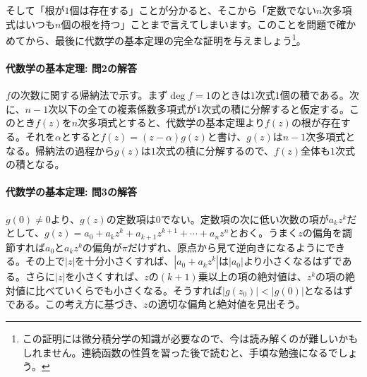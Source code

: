 そして「根が$1$個は存在する」ことが分かると、そこから「定数でない$n$次多項式はいつも$n$個の根を持つ」ことまで言えてしまいます。このことを問題で確かめてから、最後に代数学の基本定理の完全な証明を与えましょう\footnote{この証明には微分積分学の知識が必要なので、今は読み解くのが難しいかもしれません。連続函数の性質を習った後で読むと、手頃な勉強になるでしょう。}。

\paragraph{代数学の基本定理: 問2の解答}
$f$の次数に関する帰納法で示す。まず$\deg f=1$のときは$1$次式$1$個の積である。次に、$n-1$次以下の全ての複素係数多項式が$1$次式の積に分解すると仮定する。このとき$f(z)$を$n$次多項式とすると、代数学の基本定理より$f(z)$の根が存在する。それを$\alpha$とすると$f(z)=(z-\alpha)g(z)$と書け、$g(z)$は$n-1$次多項式となる。帰納法の過程から$g(z)$は$1$次式の積に分解するので、$f(z)$全体も$1$次式の積となる。


\paragraph{代数学の基本定理: 問3の解答}

$g(0)\neq 0$より、$g(z)$の定数項は$0$でない。定数項の次に低い次数の項が$a_k z^k$だとして、$g(z) = a_0 + a_k z^k + a_{k+1} z^{k+1} + \cdots + a_n z^n$とおく。うまく$z$の偏角を調節すれば$a_0$と$a_k z^k$の偏角が$\pi$だけずれ、原点から見て逆向きになるようにできる。その上で$|z|$を十分小さくすれば、$|a_0+a_k z^k|$は$|a_0|$より小さくなるはずである。さらに$|z|$を小さくすれば、$z$の$(k+1)$乗以上の項の絶対値は、$z^k$の項の絶対値に比べていくらでも小さくなる。そうすれば$|g(z_0)|<|g(0)|$となるはずである。この考え方に基づき、$z$の適切な偏角と絶対値を見出そう。

